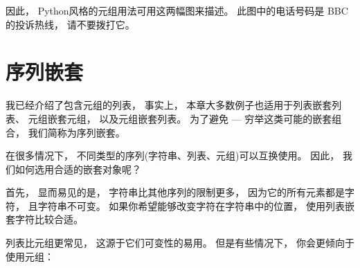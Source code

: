 {因此， Python风格的元组用法可用这两幅图来描述。
此图中的电话号码是 BBC 的投诉热线， 请不要拨打它。


\section{序列嵌套}


我已经介绍了包含元组的列表， 事实上， 本章大多数例子也适用于列表嵌套列表、 元组嵌套元组， 以及元组嵌套列表。
为了避免 --- 穷举这类可能的嵌套组合， 我们简称为序列嵌套。


在很多情况下， 不同类型的序列(字符串、列表、元组)可以互换使用。  因此， 我们如何选用合适的嵌套对象呢？
   


首先， 显而易见的是， 字符串比其他序列的限制更多， 因为它的所有元素都是字符， 且字符串不可变。
如果你希望能够改变字符在字符串中的位置， 使用列表嵌套字符比较合适。


列表比元组更常见， 这源于它们可变性的易用。
但是有些情况下， 你会更倾向于使用元组：


}

